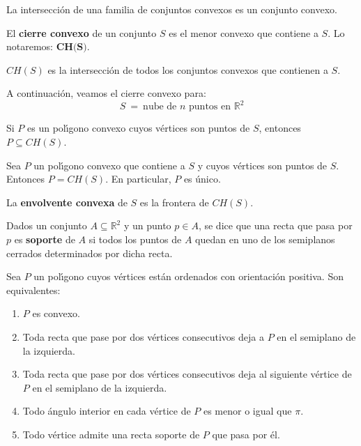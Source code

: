 \documentclass[twoside]{report}
\begin{document}
\begin{prop} La intersecci\'{o}n de una familia de
conjuntos convexos es un conjunto convexo.
\end{prop}

\begin{defi} El \textbf{cierre convexo} de un conjunto $S$
es el menor convexo que contiene a $S$. Lo notaremos: $\textbf{CH(S)}$.
\end{defi}

\begin{prop} $CH(S)$ es la intersecci\'{o}n de todos los
conjuntos convexos que contienen a $S$.
\end{prop}

\begin{nota} A continuación, veamos el cierre convexo para:
$$S \ = \ \mbox{nube de $n$ puntos en } \mathbb{R}^2$$
\end{nota}

\begin{prop} Si $P$ es un pol\'{\i}gono convexo cuyos
v\'{e}rtices son puntos de $S$, entonces $P\subseteq CH(S)$.
\end{prop}

\begin{prop} Sea $P$ un pol\'{\i}gono convexo que contiene
a $S$ y cuyos v\'{e}rtices son puntos de $S$. Entonces $P=CH(S)$. En
particular, $P$ es \'{u}nico.
\end{prop}

\begin{prop} La \textbf{envolvente convexa} de $S$ es la
frontera de $CH(S)$.
\end{prop}

\begin{defi} Dados un conjunto $A \subseteq \mathbb{R}^2$ y un
punto $p \in A$, se dice que una recta que pasa por $p$ es
\textbf{soporte} de $A$ si todos los puntos de $A$ quedan en uno de los
semiplanos cerrados determinados por dicha recta.
\end{defi}

\begin{teorema} Sea $P$ un pol\'{\i}gono cuyos v\'{e}rtices est\'{a}n
ordenados con orientaci\'{o}n positiva. Son equivalentes:
\begin{enumerate}
  \item $P$ es convexo.
  \item Toda recta que pase por dos v\'{e}rtices consecutivos deja a $P$
en el semiplano de la izquierda.
  \item Toda recta que pase por dos v\'{e}rtices consecutivos deja al
siguiente v\'{e}rtice de $P$ en el semiplano de la izquierda.
  \item Todo \'{a}ngulo interior en cada v\'{e}rtice de $P$ es menor o igual
que $\pi$.
  \item Todo v\'{e}rtice admite una recta soporte de $P$ que pasa por
\'{e}l.
\end{enumerate}
\end{teorema}
\end{document}

